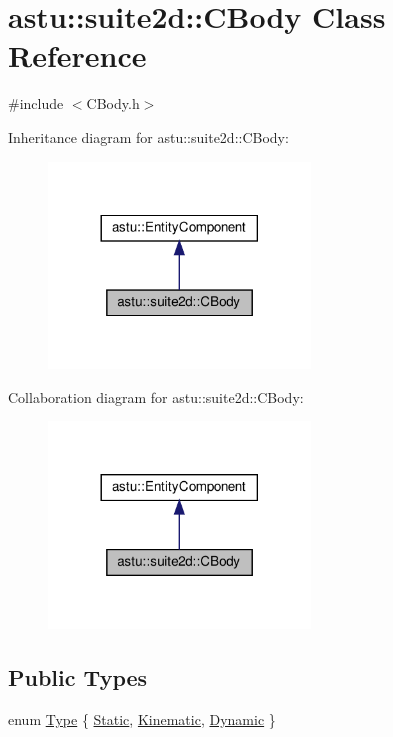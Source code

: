 \hypertarget{classastu_1_1suite2d_1_1CBody}{}\section{astu\+:\+:suite2d\+:\+:C\+Body Class Reference}
\label{classastu_1_1suite2d_1_1CBody}


{\ttfamily \#include $<$C\+Body.\+h$>$}



Inheritance diagram for astu\+:\+:suite2d\+:\+:C\+Body\+:\nopagebreak
\begin{figure}[H]
\begin{center}
\leavevmode
\includegraphics[width=197pt]{classastu_1_1suite2d_1_1CBody__inherit__graph}
\end{center}
\end{figure}


Collaboration diagram for astu\+:\+:suite2d\+:\+:C\+Body\+:\nopagebreak
\begin{figure}[H]
\begin{center}
\leavevmode
\includegraphics[width=197pt]{classastu_1_1suite2d_1_1CBody__coll__graph}
\end{center}
\end{figure}
\subsection*{Public Types}
\begin{DoxyCompactItemize}
\item 
enum \hyperlink{classastu_1_1suite2d_1_1CBody_a5731a8b9f24de5494683e4b7e8016b64}{Type} \{ \hyperlink{classastu_1_1suite2d_1_1CBody_a5731a8b9f24de5494683e4b7e8016b64af11e421e6150d5b5ca5d6acd23a5788c}{Static}, 
\hyperlink{classastu_1_1suite2d_1_1CBody_a5731a8b9f24de5494683e4b7e8016b64a56e490d706815393fb1366fc216fc335}{Kinematic}, 
\hyperlink{classastu_1_1suite2d_1_1CBody_a5731a8b9f24de5494683e4b7e8016b64a2b0c48f2b7bcf72769f693727d77f029}{Dynamic}
 \}
\end{DoxyCompactItemize}
